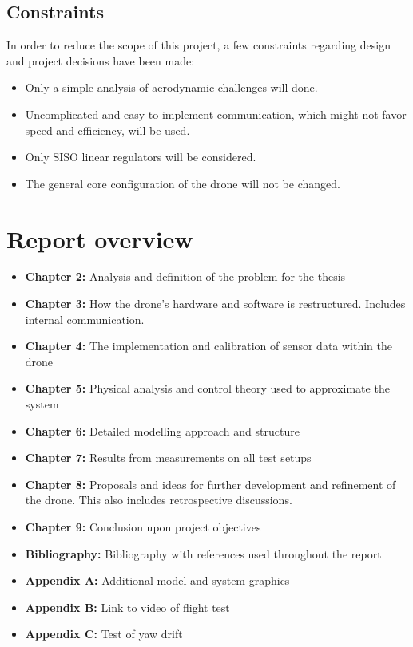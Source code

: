 \subsection{Constraints}
In order to reduce the scope of this project, a few constraints regarding design and project decisions have been made:
\begin{itemize}
    \item Only a simple analysis of aerodynamic challenges will done.
    \item Uncomplicated and easy to implement communication, which might not favor speed and efficiency, will be used. 
    \item Only SISO linear regulators will be considered.
    \item The general core configuration of the drone will not be changed. 
\end{itemize}

\section{Report overview}
\begin{itemize}
    \item \textbf{Chapter 2:} Analysis and definition of the problem for the thesis
    \item \textbf{Chapter 3:} How the drone's hardware and software is restructured. Includes internal communication.
    \item \textbf{Chapter 4:} The implementation and calibration of sensor data within the drone
    \item \textbf{Chapter 5:} Physical analysis and control theory used to approximate the system
    \item \textbf{Chapter 6:} Detailed modelling approach and structure
    \item \textbf{Chapter 7:} Results from measurements on all test setups
    \item \textbf{Chapter 8:} Proposals and ideas for further development and refinement of the drone. This also includes retrospective discussions.
    \item \textbf{Chapter 9:} Conclusion upon project objectives
    \item \textbf{Bibliography:} Bibliography with references used throughout the report
    \item \textbf{Appendix A:} Additional model and system graphics
    \item \textbf{Appendix B:} Link to video of flight test
    \item \textbf{Appendix C:} Test of yaw drift
\end{itemize}
